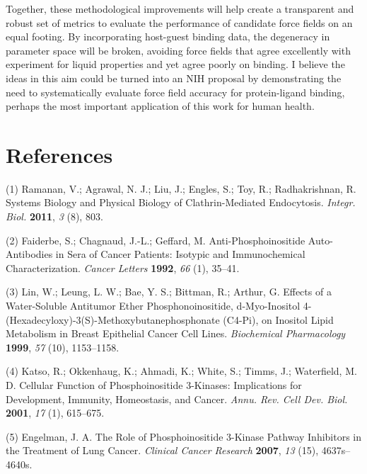 \documentclass[11pt,notitlepage]{article}
\begin{document}
Together, these methodological improvements will help create a
transparent and robust set of metrics to evaluate the performance of
candidate force fields on an equal footing. By incorporating host-guest
binding data, the degeneracy in parameter space will be broken, avoiding
force fields that agree excellently with experiment for liquid
properties and yet agree poorly on binding. I believe the ideas in this
aim could be turned into an NIH proposal by demonstrating the need to
systematically evaluate force field accuracy for protein-ligand binding,
perhaps the most important application of this work for human health.

\pagebreak
\setlength{\parskip}{0.1mm}

\hypertarget{references}{%
\section*{References}\label{references}}


\hypertarget{refs}{}
\leavevmode\hypertarget{ref-73gnQLTS}{}%
(1) Ramanan, V.; Agrawal, N. J.; Liu, J.; Engles, S.; Toy, R.;
Radhakrishnan, R. Systems Biology and Physical Biology of
Clathrin-Mediated Endocytosis. \emph{Integr. Biol.} \textbf{2011},
\emph{3} (8), 803.

\leavevmode\hypertarget{ref-8Xw2kuUO}{}%
(2) Faiderbe, S.; Chagnaud, J.-L.; Geffard, M. Anti-Phosphoinositide
Auto-Antibodies in Sera of Cancer Patients: Isotypic and Immunochemical
Characterization. \emph{Cancer Letters} \textbf{1992}, \emph{66} (1),
35--41.

\leavevmode\hypertarget{ref-12CAxA8dE}{}%
(3) Lin, W.; Leung, L. W.; Bae, Y. S.; Bittman, R.; Arthur, G. Effects
of a Water-Soluble Antitumor Ether Phosphonoinositide, d-Myo-Inositol
4-(Hexadecyloxy)-3(S)-Methoxybutanephosphonate (C4-Pi), on Inositol
Lipid Metabolism in Breast Epithelial Cancer Cell Lines.
\emph{Biochemical Pharmacology} \textbf{1999}, \emph{57} (10),
1153--1158.

\leavevmode\hypertarget{ref-l2gqdgv}{}%
(4) Katso, R.; Okkenhaug, K.; Ahmadi, K.; White, S.; Timms, J.;
Waterfield, M. D. Cellular Function of Phosphoinositide 3-Kinases:
Implications for Development, Immunity, Homeostasis, and Cancer.
\emph{Annu. Rev. Cell Dev. Biol.} \textbf{2001}, \emph{17} (1),
615--675.

\leavevmode\hypertarget{ref-izLqFTEH}{}%
(5) Engelman, J. A. The Role of Phosphoinositide 3-Kinase Pathway
Inhibitors in the Treatment of Lung Cancer. \emph{Clinical Cancer
Research} \textbf{2007}, \emph{13} (15), 4637s--4640s.
\end{document}
